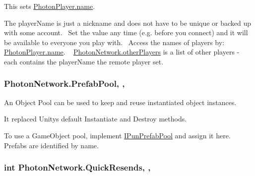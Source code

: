 This sets \hyperlink{class_photon_player_a74e5bb916dbfdb6960b8f2f11fa6aba9}{Photon\+Player.\+name}. 

The player\+Name is just a nickname and does not have to be unique or backed up with some account.~\newline
 Set the value any time (e.\+g. before you connect) and it will be available to everyone you play with.~\newline
 Access the names of players by\+: \hyperlink{class_photon_player_a74e5bb916dbfdb6960b8f2f11fa6aba9}{Photon\+Player.\+name}. ~\newline
 \hyperlink{class_photon_network_a894df24398c8cfe2d06e22ddc39576fa}{Photon\+Network.\+other\+Players} is a list of other players -\/ each contains the player\+Name the remote player set. 
\subsubsection[{\texorpdfstring{Prefab\+Pool}{PrefabPool}}]{ Photon\+Network.\+Prefab\+Pool\hspace{0.3cm}{\ttfamily [static]}, {\ttfamily [get]}, {\ttfamily [set]}}\hypertarget{class_photon_network_a1ed1ac94f91b8746d218e22146eb515e}{}\label{class_photon_network_a1ed1ac94f91b8746d218e22146eb515e}


An Object Pool can be used to keep and reuse instantiated object instances. 

It replaced Unity\textquotesingle{}s default Instantiate and Destroy methods. 

To use a Game\+Object pool, implement \hyperlink{interface_i_pun_prefab_pool}{I\+Pun\+Prefab\+Pool} and assign it here. Prefabs are identified by name. 
\subsubsection[{\texorpdfstring{Quick\+Resends}{QuickResends}}]{\setlength{\rightskip}{0pt plus 5cm}int Photon\+Network.\+Quick\+Resends\hspace{0.3cm}{\ttfamily [static]}, {\ttfamily [get]}, {\ttfamily [set]}}\hypertarget{class_photon_network_ab5e68c8f4799fabb200d08ff8c313c43}{}\label{class_photon_network_ab5e68c8f4799fabb200d08ff8c313c43}



